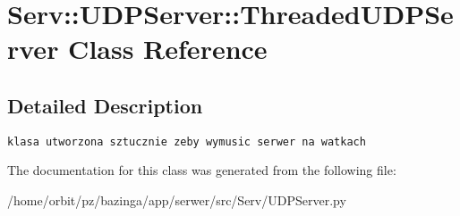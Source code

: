 \hypertarget{class_serv_1_1_u_d_p_server_1_1_threaded_u_d_p_server}{
\section{Serv::UDPServer::ThreadedUDPServer Class Reference}
\label{class_serv_1_1_u_d_p_server_1_1_threaded_u_d_p_server}
}


\subsection{Detailed Description}


\footnotesize\begin{verbatim}klasa utworzona sztucznie zeby wymusic serwer na watkach

\end{verbatim}
\normalsize
 

The documentation for this class was generated from the following file:\begin{CompactItemize}
\item 
/home/orbit/pz/bazinga/app/serwer/src/Serv/UDPServer.py\end{CompactItemize}
